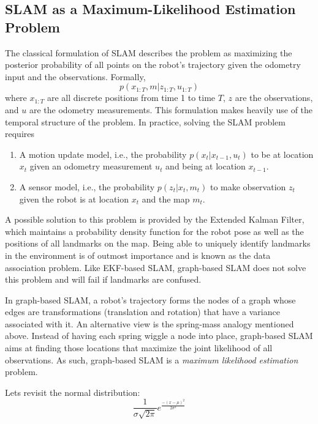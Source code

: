 \subsection{SLAM as a Maximum-Likelihood Estimation Problem}
The classical formulation of SLAM describes the problem as maximizing the posterior probability of all points on the robot's trajectory given the odometry input and the observations. Formally,
\begin{equation}
p(x_{1:T},m|z_{1:T},u_{1:T})
\end{equation}
where $ x_{1:T}$ are all discrete positions from time 1 to time $ T$, $ z$ are the observations, and $ u$ are the odometry measurements. This formulation makes heavily use of the temporal structure of the problem. In practice, solving the SLAM problem requires
\begin{enumerate}
\item A motion update model, i.e., the probability $ p(x_t|x_{t-1},u_t)$ to be at location $ x_t$ given an odometry measurement $ u_t$ and being at location $ x_{t-1}$.
\item  A sensor model, i.e., the probability $ p(z_t|x_t,m_t)$ to make observation $ z_t$ given the robot is at location $ x_t$ and the map $ m_t$.
\end{enumerate}
A possible solution to this problem is provided by the Extended Kalman Filter, which maintains a probability density function for the robot pose as well as the positions of all landmarks on the map. Being able to uniquely identify landmarks in the environment is of outmost importance and is known as the data association problem. Like EKF-based SLAM, graph-based SLAM does not solve this problem and will fail if landmarks are confused.

In graph-based SLAM, a robot's trajectory forms the nodes of a graph whose edges are transformations (translation and rotation) that have a variance associated with it. An alternative view is the spring-mass analogy mentioned above. Instead of having each spring wiggle a node into place, graph-based SLAM aims at finding those locations that maximize the joint likelihood of all observations. As such, graph-based SLAM is a \emph{maximum likelihood estimation} problem.

Lets revisit the normal distribution:
\begin{equation}
\frac{1}{\sigma\sqrt{2\pi}}e^{\frac{-(x-\mu)^2}{2\sigma^2}}
\end{equation}

